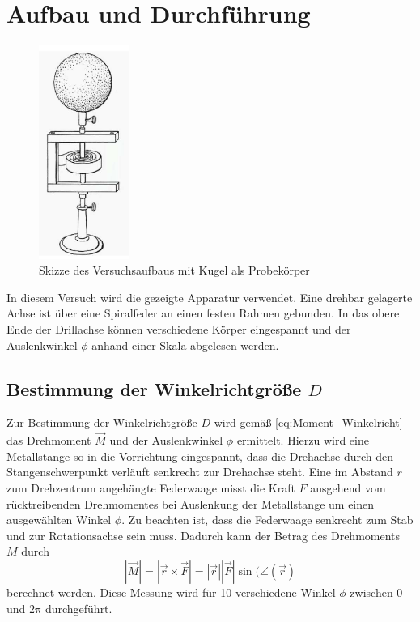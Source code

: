 \section{Aufbau und Durchführung} %
\label{sec:durchfhrung}
\begin{figure}[h]
	\label{fig:drillachse}
	\centering
	\includegraphics[height=7cm]{drillachse}
	\caption{Skizze des Versuchsaufbaus mit Kugel als Probekörper}
\end{figure}
In diesem Versuch wird die gezeigte Apparatur verwendet. 
Eine drehbar gelagerte Achse ist über eine Spiralfeder an einen festen Rahmen gebunden. 
In das obere Ende der Drillachse können verschiedene Körper eingespannt und der Auslenkwinkel $\phi$ anhand einer Skala abgelesen werden.
\subsection{Bestimmung der Winkelrichtgröße $D$}
\label{subsec:winkelricht}
Zur Bestimmung der Winkelrichtgröße $D$ wird gemäß \eqref{eq:Moment_Winkelricht} das Drehmoment $\vec{M}$ und der Auslenkwinkel $\phi$ ermittelt. Hierzu wird eine Metallstange so in die Vorrichtung eingespannt, 
dass die Drehachse durch den Stangenschwerpunkt verläuft senkrecht zur Drehachse steht.
Eine im Abstand $r$ zum Drehzentrum angehängte Federwaage misst die Kraft $F$ ausgehend vom rücktreibenden Drehmomentes bei Auslenkung der Metallstange um einen ausgewählten Winkel $\phi$. 
Zu beachten ist, dass die Federwaage senkrecht zum Stab und zur Rotationsachse sein muss. 
Dadurch kann der Betrag des Drehmoments $M$ durch
\begin{equation}
	| \vec{M} | = | \vec{r} \times \vec{F} | = |\vec{r}| |\vec{F}| \sin (\angle({\vec{r}})
\end{equation}
berechnet werden.
Diese Messung wird für 10 verschiedene Winkel $\phi$ zwischen 0 und $2\mathup{\pi}$ durchgeführt. 

